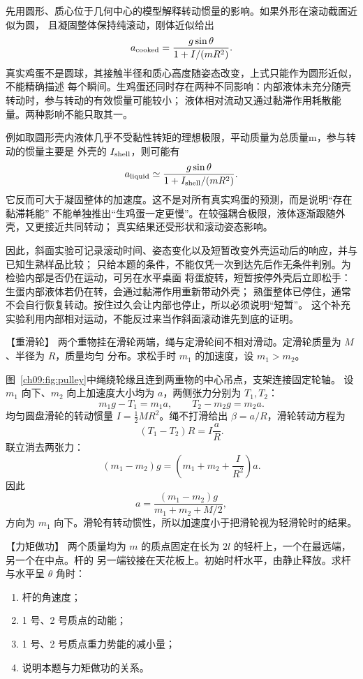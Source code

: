 {\begin{xesolution}
先用圆形、质心位于几何中心的模型解释转动惯量的影响。如果外形在滚动截面近似为圆，
且凝固整体保持纯滚动，刚体近似给出
\[
 a_{\rm cooked}=\frac{g\sin\theta}{1+I/(mR^2)}.
\]
真实鸡蛋不是圆球，其接触半径和质心高度随姿态改变，上式只能作为圆形近似，不能精确描述
每个瞬间。生鸡蛋还同时存在两种不同影响：内部液体未充分随壳转动时，参与转动的有效惯量可能较小；
液体相对流动又通过黏滞作用耗散能量。两种影响不能只取其一。

例如取圆形壳内液体几乎不受黏性转矩的理想极限，平动质量为总质量m，参与转动的惯量主要是
外壳的 $I_{\rm shell}$，则可能有
\[
 a_{\rm liquid}\simeq\frac{g\sin\theta}{1+I_{\rm shell}/(mR^2)}.
\]
它反而可大于凝固整体的加速度。这不是对所有真实鸡蛋的预测，而是说明“存在黏滞耗能”
不能单独推出“生鸡蛋一定更慢”。在较强耦合极限，液体逐渐跟随外壳，又更接近共同转动；
真实结果还受形状和滚动姿态影响。

因此，斜面实验可记录滚动时间、姿态变化以及短暂改变外壳运动后的响应，并与已知生熟样品比较；
只给本题的条件，不能仅凭一次到达先后作无条件判别。为检验内部是否仍在运动，可另在水平桌面
将蛋旋转，短暂按停外壳后立即松手：生蛋内部液体若仍在转，会通过黏滞作用重新带动外壳；
熟蛋整体已停住，通常不会自行恢复转动。按住过久会让内部也停止，所以必须说明“短暂”。
这个补充实验利用内部相对运动，不能反过来当作斜面滚动谁先到底的证明。
\end{xesolution}

\begin{origexamplebox}{【重滑轮】}\label{ch09:ex:s17-15-7}
两个重物挂在滑轮两端，绳与定滑轮间不相对滑动。定滑轮质量为 $M$、半径为 $R$，质量均匀
分布。求松手时 $m_1$ 的加速度，设 $m_1>m_2$。


\ThQPulley
\end{origexamplebox}

\begin{xesolution}
\massivePulleyDiagram

图~\ref{ch09:fig:pulley}中绳绕轮缘且连到两重物的中心吊点，支架连接固定轮轴。
设 $m_1$ 向下、$m_2$ 向上加速度大小均为 $a$，两侧张力分别为 $T_1,T_2$：
\[
 m_1g-T_1=m_1a,
 \qquad
 T_2-m_2g=m_2a.
\]
均匀圆盘滑轮的转动惯量 $I=\tfrac12MR^2$。绳不打滑给出 $\beta=a/R$，滑轮转动方程为
\[
 (T_1-T_2)R=I\frac aR.
\]
联立消去两张力：
\[
 (m_1-m_2)g
 =\left(m_1+m_2+\frac I{R^2}\right)a.
\]
因此
\[
 \boxed{a=\frac{(m_1-m_2)g}{m_1+m_2+M/2}},
\]
方向为 $m_1$ 向下。滑轮有转动惯性，所以加速度小于把滑轮视为轻滑轮时的结果。
\end{xesolution}

\begin{origexamplebox}{【力矩做功】}\label{ch09:ex:s17-15-8}
两个质量均为 $m$ 的质点固定在长为 $2l$ 的轻杆上，一个在最远端，另一个在中点。杆的
另一端铰接在天花板上。初始时杆水平，由静止释放。求杆与水平呈 $\theta$ 角时：
\begin{enumerate}[label=(\arabic*),leftmargin=2.2em]
  \item 杆的角速度；
  \item 1 号、2 号质点的动能；
  \item 1 号、2 号质点重力势能的减小量；
  \item 说明本题与力矩做功的关系。
\end{enumerate}



\end{origexamplebox}}
